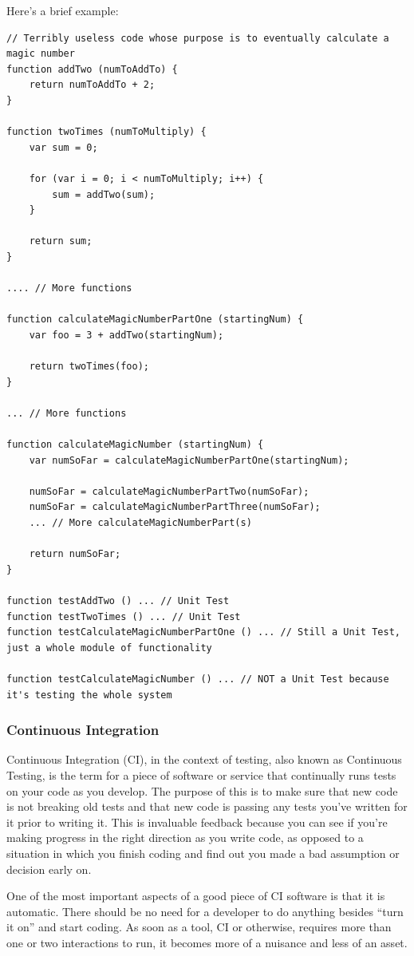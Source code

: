 \documentclass[11pt]{article}
\begin{document}
Here's a brief example:
\begin{lstlisting}
// Terribly useless code whose purpose is to eventually calculate a magic number
function addTwo (numToAddTo) {
	return numToAddTo + 2;
}

function twoTimes (numToMultiply) {
	var sum = 0;

	for (var i = 0; i < numToMultiply; i++) {
		sum = addTwo(sum);
	}

	return sum;
}

.... // More functions

function calculateMagicNumberPartOne (startingNum) {
	var foo = 3 + addTwo(startingNum);

	return twoTimes(foo);
}

... // More functions

function calculateMagicNumber (startingNum) {
	var numSoFar = calculateMagicNumberPartOne(startingNum);

	numSoFar = calculateMagicNumberPartTwo(numSoFar);
	numSoFar = calculateMagicNumberPartThree(numSoFar);
	... // More calculateMagicNumberPart(s)

	return numSoFar;
}

function testAddTwo () ... // Unit Test
function testTwoTimes () ... // Unit Test
function testCalculateMagicNumberPartOne () ... // Still a Unit Test, just a whole module of functionality

function testCalculateMagicNumber () ... // NOT a Unit Test because it's testing the whole system
\end{lstlisting}


\subsubsection{Continuous Integration}
Continuous Integration (CI), in the context of testing, also known as Continuous Testing, is the term for a piece of software or service that continually runs tests on your code as you develop. The purpose of this is to make sure that new code is not breaking old tests and that new code is passing any tests you've written for it prior to writing it. This is invaluable feedback because you can see if you're making progress in the right direction as you write code, as opposed to a situation in which you finish coding and find out you made a bad assumption or decision early on. 

One of the most important aspects of a good piece of CI software is that it is automatic. There should be no need for a developer to do anything besides ``turn it on'' and start coding. As soon as a tool, CI or otherwise, requires more than one or two interactions to run, it becomes more of a nuisance and less of an asset.
\end{document}
